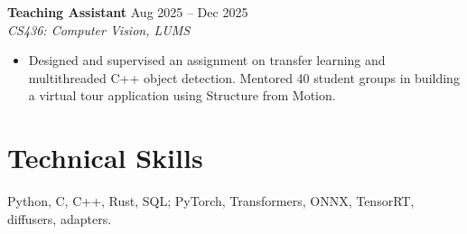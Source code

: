 \documentclass[11pt]{article}
\begin{document}
\textbf{Teaching Assistant} \hfill Aug 2025 -- Dec 2025\\
\textit{CS436: Computer Vision, LUMS}
\begin{itemize}
    \item Designed and supervised an assignment on transfer learning and multithreaded C++ object detection. Mentored 40 student groups in building a virtual tour application using Structure from Motion.
\end{itemize}

\section{Technical Skills}
Python, C, C++, Rust, SQL; PyTorch, Transformers, ONNX, TensorRT, diffusers, adapters.
\end{document}
